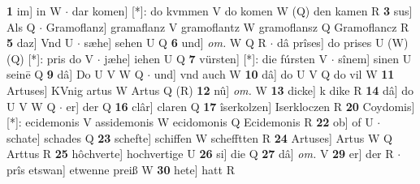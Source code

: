 \documentclass[8pt,a4paper,notitlepage]{article}
\begin{document}
\begin{table}[ht]
\begin{minipage}[t]{0.5\linewidth}
\textbf{1} im] in W  $\cdot$ dar komen] [*]: do kvmmen V do komen W (Q) den kamen R \textbf{3} sus] Als Q  $\cdot$ Gramoflanz] gramaflanz V gramoflantz W gramoflansz Q Gramoflancz R \textbf{5} daz] Vnd U  $\cdot$ sæhe] sehen U Q \textbf{6} und] \textit{om.} W Q R  $\cdot$ dâ prîses] do prises U (W) (Q) [*]: pris do V  $\cdot$ jæhe] iehen U Q \textbf{7} vürsten] [*]: die fúrsten V  $\cdot$ sînem] sinen U seinē Q \textbf{9} dâ] Do U V W Q  $\cdot$ und] vnd auch W \textbf{10} dâ] do U V Q do vil W \textbf{11} Artuses] KVnig artus W Artus Q (R) \textbf{12} nû] \textit{om.} W \textbf{13} dicke] k dike R \textbf{14} dâ] do U V W Q  $\cdot$ er] der Q \textbf{16} clâr] claren Q \textbf{17} îserkolzen] Iserkloczen R \textbf{20} Coydomis] [*]: ecidemonis V assidemonis W ecidomonis Q Ecidemonis R \textbf{22} ob] of U  $\cdot$ schate] schades Q \textbf{23} schefte] schiffen W schefftten R \textbf{24} Artuses] Artus W Q Arttus R \textbf{25} hôchverte] hochvertige U \textbf{26} si] die Q \textbf{27} dâ] \textit{om.} V \textbf{29} er] der R  $\cdot$ prîs etswan] etwenne preiß W \textbf{30} hete] hatt R \newline
\end{minipage}
\end{table}
\end{document}
